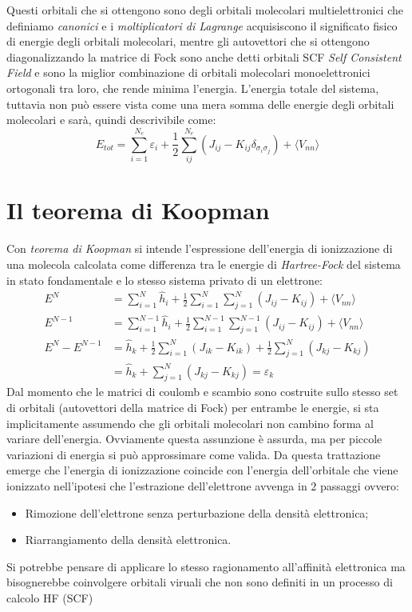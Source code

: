 \documentclass[oneside]{amsbook}
\numberwithin{section}{chapter}
\numberwithin{equation}{section}
\numberwithin{figure}{section}
\begin{document}
Questi orbitali che si ottengono sono degli orbitali molecolari multielettronici che definiamo \emph{canonici} e i \emph{moltiplicatori di Lagrange} acquisiscono il significato fisico di energie degli orbitali molecolari, mentre gli autovettori che si ottengono diagonalizzando la matrice di Fock sono anche detti orbitali SCF \emph{Self Consistent Field} e sono la miglior combinazione di orbitali molecolari monoelettronici ortogonali tra loro, che rende minima l'energia.
L'energia totale del sistema, tuttavia non può essere vista come una mera somma delle energie degli orbitali molecolari e sarà, quindi descrivibile come:
\begin{equation}
E_{tot}=\sum \limits_{i=1} ^{N_e}  \varepsilon_{i} + \frac{1}{2} \sum \limits_{ij} ^{N_e}  (J_{ij}-K_{ij}\delta_{\sigma_i \sigma_j})+\langle V_{nn}\rangle
\end{equation}
\section{Il teorema di Koopman}
Con \emph{teorema di Koopman} si intende l'espressione dell'energia di ionizzazione di una molecola calcolata come differenza tra le energie di \emph{Hartree-Fock} del sistema in stato fondamentale e lo stesso sistema privato di un elettrone:
\begin{equation}
\begin{aligned}
E^{N}&=\sum \limits_{i=1} ^{N}  \hat{h}_{i} + \frac{1}{2} \sum \limits_{i=1} ^{N} \sum \limits_{j=1} ^{N}  (J_{ij}-K_{ij})+\langle V_{nn}\rangle \\
E^{N-1}&=\sum \limits_{i=1} ^{N-1}  \hat{h}_{i} + \frac{1}{2} \sum \limits_{i=1} ^{N-1} \sum \limits_{j=1} ^{N-1}  (J_{ij}-K_{ij})+\langle V_{nn}\rangle \\
E^{N}-E^{N-1}&= \hat{h}_{k}+\frac{1}{2} \sum \limits_{i=1} ^{N}  (J_{ik}-K_{ik})+\frac{1}{2} \sum \limits_{j=1} ^{N}  (J_{kj}-K_{kj})\\
&=\hat{h}_{k}+ \sum \limits_{j=1} ^{N}  (J_{kj}-K_{kj})= \varepsilon_k
\end{aligned}
\end{equation}
Dal momento che le matrici di coulomb e scambio sono costruite sullo stesso set di orbitali (autovettori della matrice di Fock) per entrambe le energie, si sta implicitamente assumendo che gli orbitali molecolari non cambino forma al variare dell'energia. Ovviamente questa assunzione è assurda, ma per piccole variazioni di energia si può approssimare come valida.
Da questa trattazione emerge che l'energia di ionizzazione coincide con l'energia dell'orbitale che viene ionizzato nell'ipotesi che l'estrazione dell'elettrone avvenga in $2$ passaggi ovvero:
\begin{itemize}
\item Rimozione dell'elettrone senza perturbazione della densità elettronica;
\item Riarrangiamento della densità elettronica.
\end{itemize} 
Si potrebbe pensare di applicare lo stesso ragionamento all'affinità elettronica ma bisognerebbe coinvolgere orbitali viruali che non sono definiti in un processo di calcolo HF (SCF)
\end{document}
